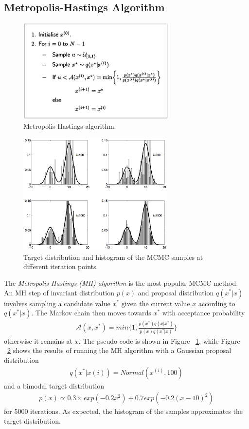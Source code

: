 \subsection{Metropolis-Hastings Algorithm}

\begin{figure}
    \centering
    \includegraphics[width=0.7\textwidth]{figures/mh.png}
    \caption{Metropolis-Hastings algorithm.}
    \label{fig:mh}
\end{figure}

\begin{figure}
    \centering
    \includegraphics[width=0.7\textwidth]{figures/mh2.png}
    \caption{Target distribution and histogram of the MCMC samples at different iteration points.}
    \label{fig:mh2}
\end{figure}

The \textit{Metropolis-Hastings (MH) algorithm} is the most popular MCMC method. An MH step of invariant distribution $p(x)$ and proposal distribution $q(x^*	| x)$ involves sampling a candidate value $x^*$ given the current value $x$ according to $q(x^* | x)$. The Markov chain then moves towards $x^*$ with acceptance probability
\begin{align*}
  \mathscr{A}(x, x^*) = min\{1,\frac{p(x^*)q(x | x^*)}{p(x)q(x^* | x)} \}
\end{align*}
otherwise it remains at $x$. The pseudo-code is shown in Figure ~\ref{fig:mh}, while Figure ~\ref{fig:mh2} shows the results of running the MH algorithm with a Gaussian proposal distribution
\begin{align*}
  q(x^* | x(i)) = Normal(x^{(i)}, 100)
\end{align*}
and a bimodal target distribution
\begin{align*}
  p(x) \propto 0.3 \times exp(−0.2x^2) + 0.7 exp(−0.2{(x - 10)}^2)
\end{align*}
for 5000 iterations. As expected, the histogram of the samples approximates the target distribution.

